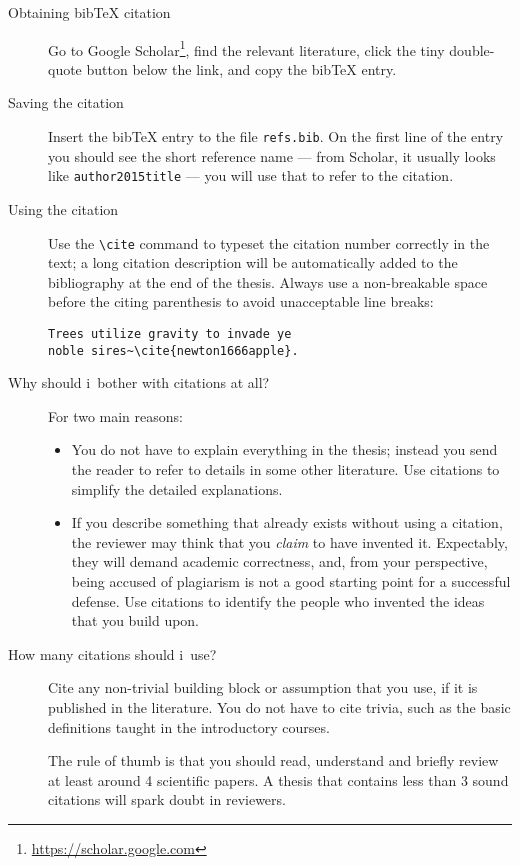 \begin{description}
\item[Obtaining bibTeX citation] Go to Google Scholar\footnote{\url{https://scholar.google.com}}, find the relevant literature, click the tiny double-quote button below the link, and copy the bibTeX entry.
\item[Saving the citation] Insert the bibTeX entry to the file \texttt{refs.bib}. On the first line of the entry you should see the short reference name --- from Scholar, it usually looks like \texttt{author2015title} --- you will use that to refer to the citation.
\item[Using the citation] Use the \verb|\cite| command to typeset the citation number correctly in the text; a long citation description will be automatically added to the bibliography at the end of the thesis. Always use a non-breakable space before the citing parenthesis to avoid unacceptable line breaks:
\begin{Verbatim}
Trees utilize gravity to invade ye
noble sires~\cite{newton1666apple}.
\end{Verbatim}
\item[Why should i~bother with citations at all?] For two main reasons:
\begin{itemize}
\item You do not have to explain everything in the thesis; instead you send the reader to refer to details in some other literature. Use citations to simplify the detailed explanations.
\item If you describe something that already exists without using a citation, the reviewer may think that you \emph{claim} to have invented it. Expectably, they will demand academic correctness, and, from your perspective, being accused of plagiarism is not a good starting point for a successful defense. Use citations to identify the people who invented the ideas that you build upon.
\end{itemize}
\item[How many citations should i~use?]
Cite any non-trivial building block or assumption that you use, if it is published in the literature. You do not have to cite trivia, such as the basic definitions taught in the introductory courses.

The rule of thumb is that you should read, understand and briefly review at least around 4 scientific papers. A thesis that contains less than 3 sound citations will spark doubt in reviewers.
\end{description}

